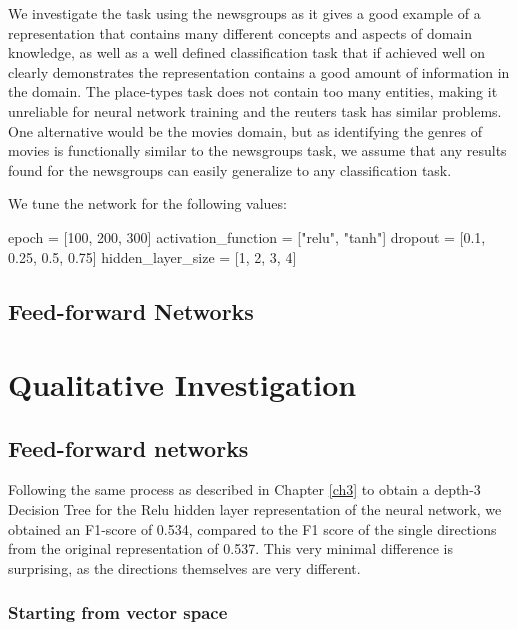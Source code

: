 We investigate the task using the newsgroups as it gives a good example of a representation that contains many different concepts and aspects of domain knowledge, as well as a well defined classification task that if achieved well on clearly demonstrates the representation contains a good amount of information in the domain. The place-types task does not contain too many entities, making it unreliable for neural network training and the reuters task has similar problems. One alternative would be the movies domain, but as identifying the genres of movies is functionally similar to the newsgroups task, we assume that any results found for the newsgroups can easily generalize to any classification task.

We tune the network for the following values: 

epoch = [100, 200, 300]
activation_function = ["relu", "tanh"]
dropout = [0.1, 0.25, 0.5, 0.75]
hidden_layer_size = [1,  2, 3, 4]

\subsection{Feed-forward Networks}


\section{Qualitative Investigation}

\subsection{Feed-forward networks}



Following the same process as described in Chapter \ref{ch3} to obtain a depth-3 Decision Tree for the Relu hidden layer representation of the neural network, we obtained an F1-score of 0.534, compared to the F1 score of the single directions from the original representation of 0.537. This very minimal difference is surprising, as the directions themselves are very different.





\subsubsection{Starting from vector space}

